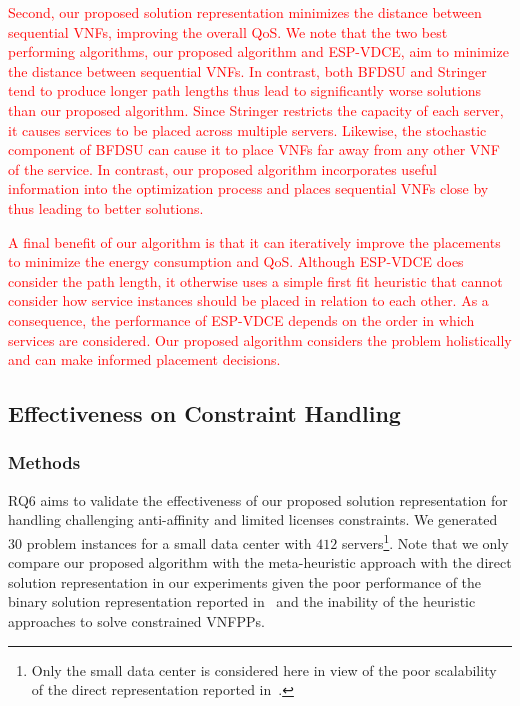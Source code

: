 \textcolor{red}{
Second, our proposed solution representation minimizes the distance between sequential VNFs, improving the overall QoS. We note that the two best performing algorithms, our proposed algorithm and ESP-VDCE, aim to minimize the distance between sequential VNFs. In contrast, both BFDSU and Stringer tend to produce longer path lengths thus lead to significantly worse solutions than our proposed algorithm. Since Stringer restricts the capacity of each server, it causes services to be placed across multiple servers. Likewise, the stochastic component of BFDSU can cause it to place VNFs far away from any other VNF of the service. In contrast, our proposed algorithm incorporates useful information into the optimization process and places sequential VNFs close by thus leading to better solutions.
}

\textcolor{red}{
A final benefit of our algorithm is that it can iteratively improve the placements to minimize the energy consumption and QoS. Although ESP-VDCE does consider the path length, it otherwise uses a simple first fit heuristic that cannot consider how service instances should be placed in relation to each other. As a consequence, the performance of ESP-VDCE depends on the order in which services are considered. Our proposed algorithm considers the problem holistically and can make informed placement decisions.
}

\vspace{1em}
\noindent
{}

\subsection{Effectiveness on Constraint Handling}
\label{sec:custom_operators}

\subsubsection{Methods}

RQ6 aims to validate the effectiveness of our proposed solution representation for handling challenging anti-affinity and limited licenses constraints. We generated $30$ problem instances for a small data center with $412$ servers\footnote{Only the small data center is considered here in view of the poor scalability of the direct representation reported in~.}. Note that we only compare our proposed algorithm with the meta-heuristic approach with the direct solution representation in our experiments given the poor performance of the binary solution representation reported in~ and the inability of the heuristic approaches to solve constrained VNFPPs.

